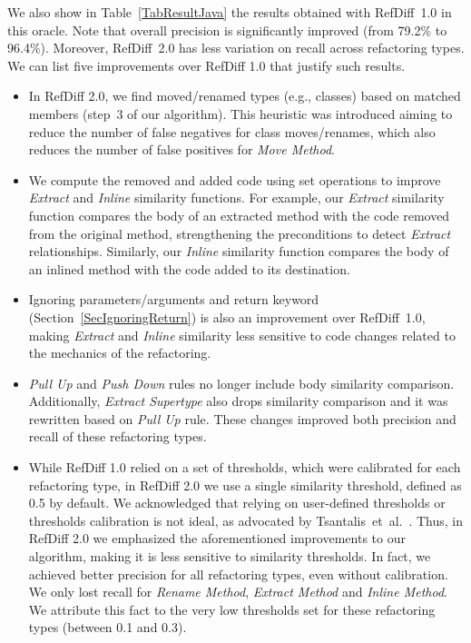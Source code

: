 We also show in Table~\ref{TabResultJava} the results obtained with RefDiff~1.0 in this oracle. Note that overall precision is significantly improved (from 79.2\% to 96.4\%). Moreover, RefDiff~2.0 has less variation on recall across refactoring types.
We can list five improvements over RefDiff 1.0 that justify such results.
\begin{itemize}
\item In RefDiff 2.0, we find moved/renamed types (e.g., classes) based on matched members (step~3 of our algorithm). This heuristic was introduced aiming to reduce the number of false negatives for class moves/renames, which also reduces the number of false positives for \emph{Move Method}.

\item We compute the removed and added code using set operations to improve \emph{Extract} and \emph{Inline} similarity functions. For example, our \emph{Extract} similarity function compares the body of an extracted method with the code removed from the original method, strengthening the preconditions to detect \emph{Extract} relationships. Similarly, our \emph{Inline} similarity function compares the body of an inlined method with the code added to its destination.

\item Ignoring parameters/arguments and return keyword (Section~\ref{SecIgnoringReturn}) is also an improvement over RefDiff~1.0, making \emph{Extract} and \emph{Inline} similarity less sensitive to code changes related to the mechanics of the refactoring.

\item \emph{Pull Up} and \emph{Push Down} rules no longer include body similarity comparison. Additionally, \emph{Extract Supertype} also drops similarity comparison and it was rewritten based on \emph{Pull Up} rule. These changes improved both precision and recall of these refactoring types.

\item While RefDiff 1.0 relied on a set of thresholds, which were calibrated for each refactoring type, in RefDiff 2.0 we use a single similarity threshold, defined as 0.5 by default.
We acknowledged that relying on user-defined thresholds or thresholds calibration is not ideal, as advocated by Tsantalis~et~al.~\cite{tsantalis2018rminer}.
Thus, in RefDiff 2.0 we emphasized the aforementioned improvements to our algorithm, making it is less sensitive to similarity thresholds.
In fact, we achieved better precision for all refactoring types, even without calibration.
We only lost recall for \emph{Rename Method}, \emph{Extract Method} and \emph{Inline Method}.
We attribute this fact to the very low thresholds set for these refactoring types (between 0.1 and 0.3).

\end{itemize}

